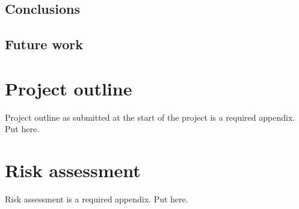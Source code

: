     \subsection{Conclusions}
	
	\subsection{Future work}


\printbibliography[title={References},heading=bibintoc] %



\begin{uomappendix} 
    \section{Project outline}
    Project outline as submitted at the start of the project is a required appendix. Put here. 
    
    \section{Risk assessment}
    Risk assessment is a required appendix. Put here.
    
\end{uomappendix}


